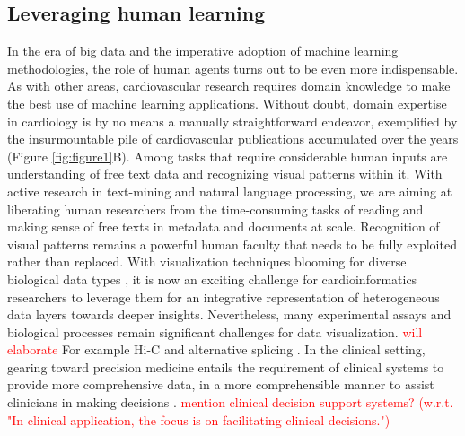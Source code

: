 \documentclass[letter]{bioinfo}
\newcommand{\comment}[1]{\textcolor{red}{#1}}
\begin{document}
	\subsection*{Leveraging human learning}
	In the era of big data and the imperative adoption of machine learning methodologies, the role of human agents turns out to be even more indispensable. As with other areas, cardiovascular research requires domain knowledge to make the best use of machine learning applications. Without doubt, domain expertise in cardiology is by no means a manually straightforward endeavor, exemplified by the insurmountable pile of cardiovascular publications accumulated over the years (Figure \ref{fig:figure1}B). Among tasks that require considerable human inputs are understanding of free text data and recognizing visual patterns within it. With active research in text-mining and natural language processing, we are aiming at liberating human researchers from the time-consuming tasks of reading and making sense of free texts in metadata and documents at scale. Recognition of visual patterns remains a powerful human faculty that needs to be fully exploited rather than replaced. With visualization techniques blooming for diverse biological data types \citep{Pavlopoulos:2015:Visualizing}, it is now an exciting challenge for cardioinformatics researchers to leverage them for an integrative representation of heterogeneous data layers towards deeper insights. Nevertheless, many experimental assays and biological processes remain significant challenges for data visualization. \comment{will elaborate} For example Hi-C \citep{Kerpedjiev:2018:HiGlass,Lekschas:2018:HiPiler} and alternative splicing \citep{Katz:2015:Quantitative,Strobelt:2016:Vials}.
	In the clinical setting, gearing toward precision medicine entails the requirement of clinical systems to provide more comprehensive data, in a more comprehensible manner to assist clinicians in making decisions \citep{Antman:2016:Precision}. \comment{mention clinical decision support systems? (w.r.t. "In clinical application, the focus is on facilitating clinical decisions.")}
	
		
\end{document}
